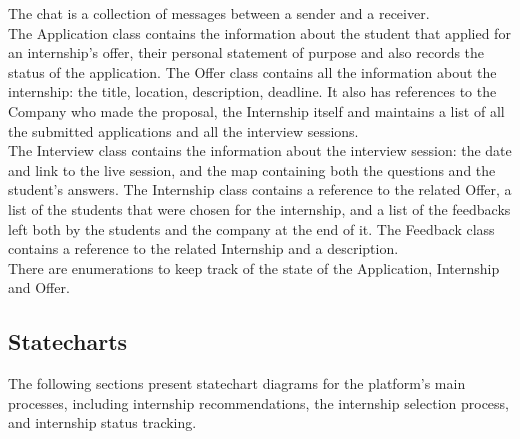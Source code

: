 The chat is a collection of messages between a sender and a receiver. \\
The Application class contains the information about the student that applied for an internship's offer, their personal statement of purpose and also records 
the status of the application. The Offer class contains all the information about the internship: the title, location, description, deadline. It also has
references to the Company who made the proposal, the Internship itself and maintains a list of all the submitted applications and all the interview sessions.\\
The Interview class contains the information about the interview session: the date and link to the live session, and the map containing both the questions and 
the student's answers. The Internship class contains a reference to the related Offer, a list of the students that were chosen for the internship, and a list of
the feedbacks left both by the students and the company at the end of it. The Feedback class contains a reference to the related Internship and a description.\\
There are enumerations to keep track of the state of the Application, Internship and Offer.

\subsection{Statecharts}\label{subsec:statecharts}
The following sections present statechart diagrams for the platform's main processes, including internship recommendations, the internship 
selection process, and internship status tracking. 

